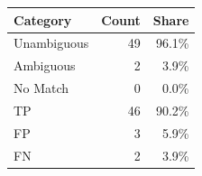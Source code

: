 \begin{tabular}{lrr}
\toprule
Category & Count & Share \\
\midrule
Unambiguous & 49 & 96.1\% \\
Ambiguous & 2 & 3.9\% \\
No Match & 0 & 0.0\% \\
\midrule
TP & 46 & 90.2\% \\
FP & 3 & 5.9\% \\
FN & 2 & 3.9\% \\
\bottomrule
\end{tabular}
